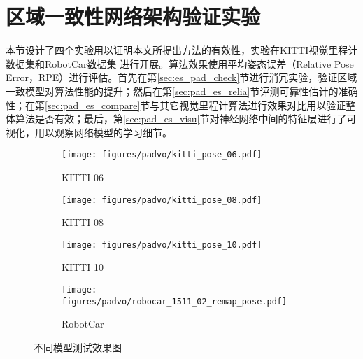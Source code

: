 

\section{区域一致性网络架构验证实验}
\label{sec:experiments}

%
本节设计了四个实验用以证明本文所提出方法的有效性，实验在KITTI视觉里程计数据集\cite{geiger2012kitti}和RobotCar数据集 \cite{RobotCarDatasetIJRR}进行开展。算法效果使用平均姿态误差（Relative Pose Error，RPE）\cite{geiger2012kitti}进行评估。首先在第\ref{sec:es_pad_check}节进行消冗实验，验证区域一致模型对算法性能的提升；然后在第\ref{sec:pad_es_relia}节评测可靠性估计的准确性；在第\ref{sec:pad_es_compare}节与其它视觉里程计算法进行效果对比用以验证整体算法是否有效；最后，第\ref{sec:pad_es_visu}节对神经网络中间的特征层进行了可视化，用以观察网络模型的学习细节。

\begin{figure}[t]

  \centering
  \begin{subfigure}[b]{0.48\textwidth}
    \texttt{[image: figures/padvo/kitti\_pose\_06.pdf]}
    \caption{KITTI 06}
    \label{fig:model_test_kitti_06}
  \end{subfigure}
  \vspace*{2mm}
  \begin{subfigure}[b]{0.48\textwidth}
    \texttt{[image: figures/padvo/kitti\_pose\_08.pdf]}
    \caption{KITTI 08}
    \label{fig:model_test_kitti_08}
  \end{subfigure}
  \vspace*{2mm}
  \begin{subfigure}[b]{0.48\textwidth}
    \texttt{[image: figures/padvo/kitti\_pose\_10.pdf]}
    \caption{KITTI 10}
    \label{fig:model_test_kitti_10}
  \end{subfigure}
  \begin{subfigure}[b]{0.48\textwidth}
    \texttt{[image: figures/padvo/robocar\_1511\_02\_remap\_pose.pdf]}
    \caption{RobotCar}
    \label{fig:model_test_RobotCar}
  \end{subfigure}

  \caption{不同模型测试效果图}
  {\label{fig:model_test}}
  \end{figure}



